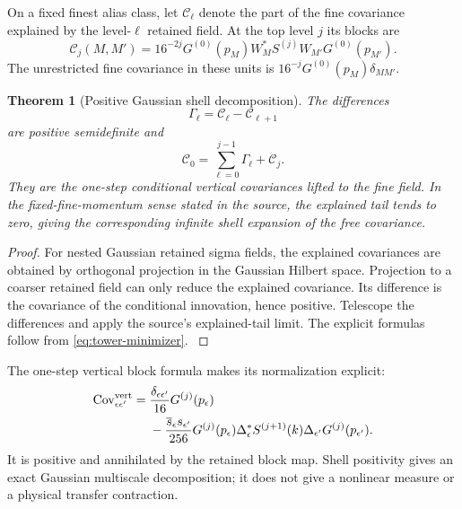 \documentclass[11pt,oneside,openany]{book}
\newtheorem{theorem}{Theorem}[chapter]
\theoremstyle{definition}
\theoremstyle{remark}
\newcommand{\src}[2]{\cite[#2]{#1}}
\begin{document}
On a fixed finest alias class, let $\mathcal C_\ell$ denote the part of the fine covariance explained by the level-$\ell$ retained field. At the top level $j$ its blocks are
\begin{equation}\label{eq:explained-cov}
\mathcal C_j(M,M')=16^{-2j}G^{(0)}(p_M)W_M^*S^{(j)}W_{M'}G^{(0)}(p_{M'}).
\end{equation}
The unrestricted fine covariance in these units is $16^{-j}G^{(0)}(p_M)\delta_{MM'}$.

\begin{theorem}[Positive Gaussian shell decomposition]\label{thm:shells}
The differences
\[
\Gamma_\ell=\mathcal C_\ell-\mathcal C_{\ell+1}
\]
are positive semidefinite and
\begin{equation}\label{eq:shell-telescope}
\mathcal C_0=\sum_{\ell=0}^{j-1}\Gamma_\ell+\mathcal C_j.
\end{equation}
They are the one-step conditional vertical covariances lifted to the fine field. In the fixed-fine-momentum sense stated in the source, the explained tail tends to zero, giving the corresponding infinite shell expansion of the free covariance.
\end{theorem}
\begin{proof}
For nested Gaussian retained sigma fields, the explained covariances are obtained by orthogonal projection in the Gaussian Hilbert space. Projection to a coarser retained field can only reduce the explained covariance. Its difference is the covariance of the conditional innovation, hence positive. Telescope the differences and apply the source's explained-tail limit. The explicit formulas follow from \cref{eq:tower-minimizer}. \src{F11}{V38}
\end{proof}

The one-step vertical block formula makes its normalization explicit:
\begin{equation}\label{eq:vertical}
\begin{aligned}
\operatorname{Cov}^{\rm vert}_{\epsilon\epsilon'}
={}&\frac{\delta_{\epsilon\epsilon'}}{16}G^{(j)}(p_\epsilon)\\
&-\frac{\overline s_\epsilon s_{\epsilon'}}{256}
G^{(j)}(p_\epsilon)\Delta_\epsilon^*S^{(j+1)}(k)
\Delta_{\epsilon'}G^{(j)}(p_{\epsilon'}).
\end{aligned}
\end{equation}
It is positive and annihilated by the retained block map. Shell positivity gives an exact Gaussian multiscale decomposition; it does not give a nonlinear measure or a physical transfer contraction.
\end{document}
